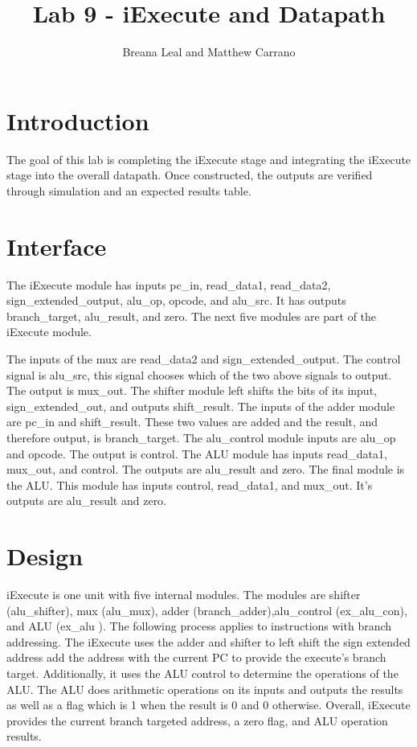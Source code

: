 \documentclass{article}
\author{Breana Leal and Matthew Carrano}
\title{Lab 9 - iExecute and Datapath}
\begin{document}
\maketitle

\section{Introduction}
The goal of this lab is completing the iExecute stage and integrating the iExecute stage into the overall datapath. Once constructed, the outputs are verified through simulation and an expected results table.

\section{Interface}
The iExecute module has inputs pc\_in, read\_data1, read\_data2, sign\_extended\_output, alu\_op, opcode, and alu\_src. It has outputs branch\_target, alu\_result, and zero. The next five modules are part of the iExecute module. 

The inputs of the mux are read\_data2 and sign\_extended\_output. The control signal is alu\_src, this signal chooses which of the two above signals to output. The output is mux\_out.  
The shifter module left shifts the bits of its input, sign\_extended\_out, and outputs shift\_result. 
The inputs of the adder module are pc\_in and shift\_result. These two values are added and the result, and therefore output, is branch\_target.
The alu\_control module inputs are alu\_op and opcode. The output is control.
The ALU module has inputs read\_data1, mux\_out, and control. The outputs are alu\_result and zero. 
The final module is the ALU. This module has inputs control, read\_data1, and mux\_out. It's outputs are alu\_result and zero. 

\section{Design}
iExecute is one unit with five internal modules. The modules are shifter (alu\_shifter), mux (alu\_mux), adder (branch\_adder),alu\_control (ex\_alu\_con), and ALU (ex\_alu ). The following process applies to instructions with branch addressing. The iExecute uses the adder and shifter to left shift the sign extended address add the address with the current PC to provide the execute's branch target. Additionally, it uses the ALU control to determine the operations of the ALU. The ALU does arithmetic operations on its inputs and outputs the results as well as a flag which is 1 when the result is 0 and 0 otherwise. Overall, iExecute provides the current branch targeted address, a zero flag, and ALU operation results.
\end{document}
